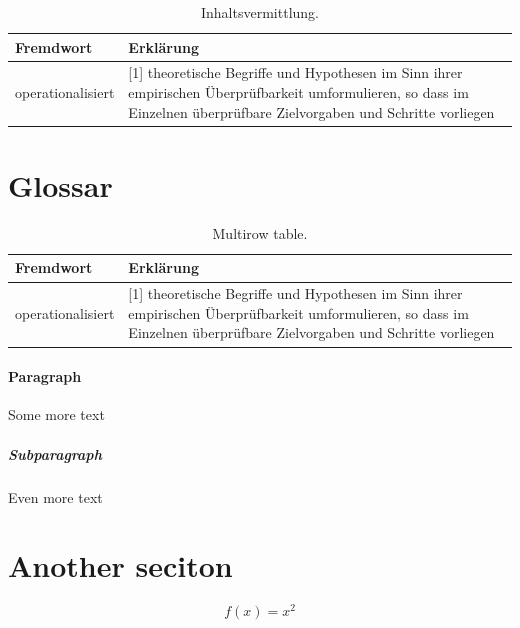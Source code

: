 \documentclass[a4paper, 12pt]{article}
\begin{document}
\newpage
\begin{table}[h!]
	\begin{center}
		\caption{Inhaltsvermittlung.}
		\label{tab:table1}
		\begin{tabular}{|l|p{10cm}|}
			\textbf{Fremdwort} & \textbf{Erklärung}\\
			\hline
			operationalisiert &[1] theoretische Begriffe und Hypothesen im Sinn ihrer empirischen Überprüfbarkeit umformulieren, so dass im Einzelnen überprüfbare Zielvorgaben und Schritte vorliegen\\
		\end{tabular}
	\end{center}
\end{table}

        
\newpage        
    \section{Glossar}
   \begin{table}[h!]
   \begin{center}
   	\caption{Multirow table.}
   	\label{tab:table1}
   	\begin{tabular}{|l|p{10cm}|}
   		\textbf{Fremdwort} & \textbf{Erklärung}\\
   		\hline
   		operationalisiert &[1] theoretische Begriffe und Hypothesen im Sinn ihrer empirischen Überprüfbarkeit umformulieren, so dass im Einzelnen überprüfbare Zielvorgaben und Schritte vorliegen\\
   	\end{tabular}
   \end{center}
\end{table}



\newpage

    \paragraph{Paragraph}
        Some more text

    \subparagraph{Subparagraph}
        Even more text

    \section{Another seciton}

\begin{equation*}
    f(x) = x^2
\end{equation*}
\end{document}
